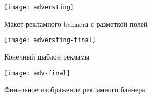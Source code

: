 \begin{figure}[H]
    \centering
    \texttt{[image: adversting]}
    \caption{Макет рекламного \gls{banner}а с разметкой полей}\label{fig:adversting-template}
\end{figure}

\begin{figure}[htpb]
    \centering
    \texttt{[image: adversting-final]}
    \caption{Конечный шаблон рекламы}\label{fig:adversting-final}
\end{figure}

\begin{figure}[htpb]
    \centering
    \texttt{[image: adv-final]}
    \caption{Финальное изображение рекламного баннера}%
    \label{fig:adv-final}
\end{figure}
